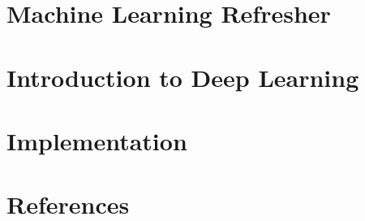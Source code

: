 \section[ML]{Machine Learning Refresher}


\section[Intro]{Introduction to Deep Learning}

% 
% 
% 

\section[Libs]{Implementation}
% 

% 

% 
% 

% 
% 

 
 
% 


 \section[Refs]{References}
 
